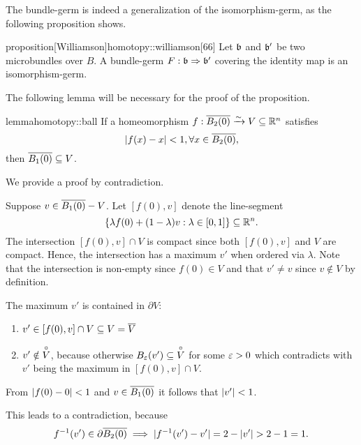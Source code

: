 \begin{myparagraph}
    The bundle-germ is indeed a generalization of the isomorphism-germ,
    as the following proposition shows.
\end{myparagraph}

\begin{mystatement}{proposition}[Williamson]{homotopy::williamson}[66]
    Let $\bb$ and $\bb'$ be two microbundles over $B$.
    A bundle-germ $\germdef{F}{\bb}{\bb'}$ covering
    the identity map is an isomorphism-germ.
\end{mystatement}

\begin{myparagraph}
    The following lemma will be necessary for the proof of the proposition.    
\end{myparagraph}

\begin{mystatement}{lemma}{homotopy::ball}
    If a homeomorphism $f: \clball[2] \isomto V \sub \R^n$ satisfies
    \[ \abs{f(x) - x} < 1, \forall x \in \clball[2], \]
    then $\clball[1] \sub V$.
\end{mystatement}

\begin{myproof}
    We provide a proof by contradiction.

    Suppose $v \in \clball[1] - V$.
    Let $[f(0), v]$ denote the line-segment
    \[ \{\lambda f(0) + (1 - \lambda) v:\lambda \in [0, 1]\} \subseteq{} \mathbb{R}^n. \]
    The intersection $[f(0), v] \cap V$ is compact
    since both $[f(0), v]$ and $V$ are compact.
    Hence, the intersection has a maximum $v'$ when ordered via $\lambda$.
    Note that the intersection is non-empty since $f(0) \in V$
    and that $v' \neq v$ since $v \notin V$ by definition.

    The maximum $v'$ is contained in $\partial V$:
    \begin{enumerate}
        \item $v' \in [f(0), v] \cap V \subseteq{} V = \overline{V}$
        \item $v' \notin \overset{\circ}{V}$, because otherwise
        $\ball[\eps][v'] \sub \inner{V}$ for some $\varepsilon{} > 0$
        which contradicts with $v'$ being the maximum in $[f(0), v] \cap V$.
    \end{enumerate}

    From $\vert{} f(0) - 0 \vert{} < 1$ and $v \in \clball[1]$ it follows that $\vert{} v' \vert{} < 1$. 

    This leads to a contradiction, because
    \[ \inv{f}(v') \in \partial\clball[2] \implies \abs{\inv{f}(v') - v'} = 2 - \abs{v'} > 2 - 1 = 1. \]
\end{myproof}